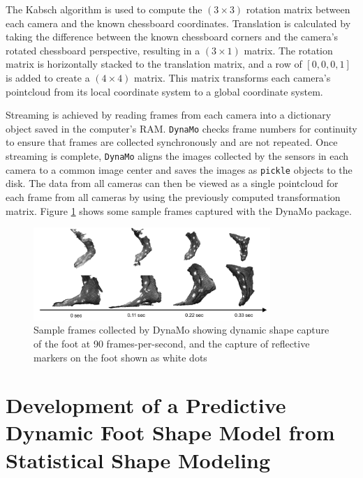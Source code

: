\documentclass[defaultstyle,11pt]{comps}
\begin{document}
The Kabsch algorithm \citep{Kabsch1976} is used to compute the \((3\times3)\) rotation matrix between each camera and the known chessboard coordinates.
Translation is calculated by taking the difference between the known chessboard corners and the camera's rotated chessboard perspective, resulting in a \((3\times1)\) matrix.
The rotation matrix is horizontally stacked to the translation matrix, and a row of \([0,0,0,1]\) is added to create a \((4\times4)\) matrix.
This matrix transforms each camera's pointcloud from its local coordinate system to a global coordinate system.

Streaming is achieved by reading frames from each camera into a dictionary object saved in the computer's RAM.
\texttt{DynaMo} checks frame numbers for continuity to ensure that frames are collected synchronously and are not repeated.
Once streaming is complete, \texttt{DynaMo} aligns the images collected by the sensors in each camera to a common image center and saves the images as \texttt{pickle} objects to the disk.
The data from all cameras can then be viewed as a single pointcloud for each frame from all cameras by using the previously computed transformation matrix.
Figure \ref{fig:SA2-sampleFrames} shows some sample frames captured with the DynaMo package.

\begin{figure}
\hypertarget{fig:SA2-sampleFrames}{%
\centering
\includegraphics[width=0.8\textwidth,height=\textheight]{../fig/SA2/sampleFrames.png}
\caption{Sample frames collected by DynaMo showing dynamic shape capture of the foot at 90 frames-per-second, and the capture of reflective markers on the foot shown as white dots}\label{fig:SA2-sampleFrames}
}
\end{figure}

\hypertarget{development-of-a-predictive-dynamic-foot-shape-model-from-statistical-shape-modeling}{%
\section{Development of a Predictive Dynamic Foot Shape Model from Statistical Shape Modeling}\label{development-of-a-predictive-dynamic-foot-shape-model-from-statistical-shape-modeling}}
\end{document}
